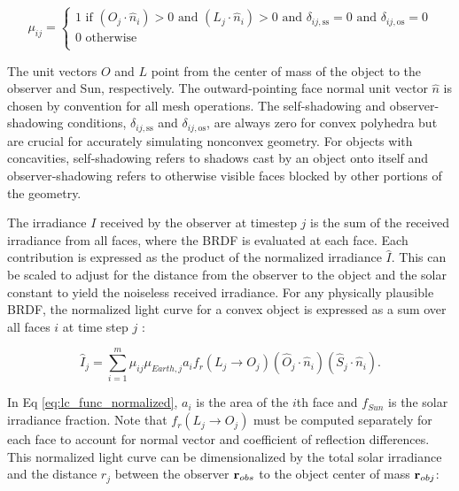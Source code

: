 \begin{equation} \label{eq:cvx_shadow_cond}
  \mu_{ij} = \begin{cases}
    1 \text{ if } \left( O_j \cdot \hat{n}_i \right) > 0 \text{ and } \left( L_j \cdot \hat{n}_i \right) > 0 
	  \text{ and } \delta_{ij,\text{ss}} = 0 \text{ and } \delta_{ij,\text{os}} = 0\\
    0 \text{ otherwise } \\
  \end{cases}
\end{equation}

The unit vectors $O$ and $L$ point from the center of mass of the object to the observer and Sun, respectively. The outward-pointing face normal unit vector $\hat{n}$ is chosen by convention for all mesh operations. 
The self-shadowing and observer-shadowing conditions, $\delta_{ij,\text{ss}}$ and $\delta_{ij,\text{os}}$, 
are always zero for convex polyhedra but are crucial for accurately simulating nonconvex geometry. 
For objects with concavities, self-shadowing refers to shadows cast by an object onto itself and observer-shadowing 
refers to otherwise visible faces blocked by other portions of the geometry.

The irradiance $I$ received by the observer at timestep $j$ is the sum of the received irradiance from all faces, where the BRDF is evaluated at each face. Each contribution is expressed as the product of the
normalized irradiance $\hat{I}$. This can be scaled to adjust for the distance from the observer to
the object and the solar constant to yield the noiseless received irradiance. For any physically plausible BRDF, the normalized light curve for a convex object is expressed as a sum over all faces $i$ at time step $j$ \cite{fan2020thesis}:

\begin{equation} \label{eq:lc_func_normalized}
  \hat{I}_{j} = \sum_{i=1}^{m}{\mu_{ij} \mu_{Earth,j} a_i f_r(L_j \rightarrow O_j) \left( \hat{O}_j \cdot \hat{n}_i \right) \left( \hat{S}_j \cdot \hat{n}_i \right)}.
\end{equation}

In Eq \ref{eq:lc_func_normalized}, $a_i$ is the area of the $i$th face and $f_{Sun}$ is the solar irradiance fraction. Note that $f_r(L_j \rightarrow O_j)$ must be computed separately for each face to account for normal vector and coefficient of reflection differences. This normalized light curve can be dimensionalized by the total solar irradiance and the distance $r_j$ between the observer $\mathbf{r}_{obs}$ to the object center of mass $\mathbf{r}_{obj}$:

